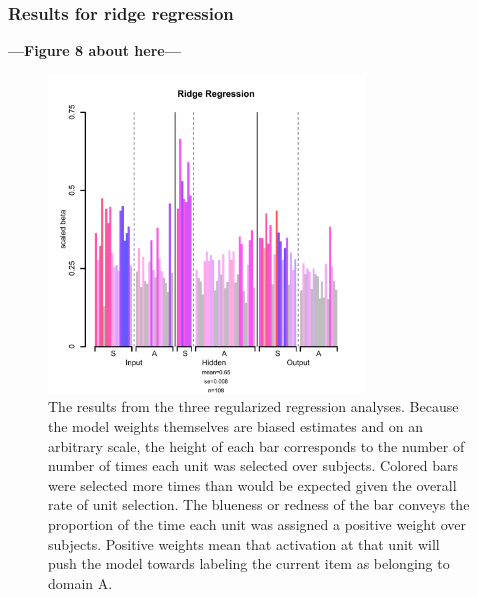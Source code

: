\subsubsection{Results for ridge regression}
\textbf{---Figure 8 about here---}
\begin{figure}
\centering
\includegraphics[width=0.75\textwidth]{figures/ridge_only.pdf}
\caption{\label{fig.ridge} The results from the three regularized regression analyses. Because the model weights themselves are biased estimates and on an arbitrary scale, the height of each bar corresponds to the number of number of times each unit was selected over subjects. Colored bars were selected more times than would be expected given the overall rate of unit selection. The blueness or redness of the bar conveys the proportion of the time each unit was assigned a positive weight over subjects. Positive weights mean that activation at that unit will push the model towards labeling the current item as belonging to domain A.}
\end{figure}

